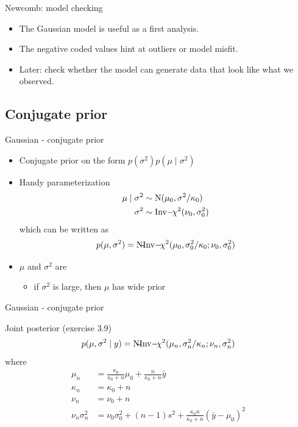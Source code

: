 \documentclass[10pt]{beamer}
\begin{document}
\begin{frame}{Newcomb: model checking}

  \begin{itemize}
  \item The Gaussian model is useful as a first analysis.
  \item The negative coded values hint at outliers or model misfit.
  \item Later: check whether the model can generate data that look like what we
    observed.
  \end{itemize}

\end{frame}

\subsection{Conjugate prior}

\begin{frame}{Gaussian - conjugate prior}

  \begin{itemize}
  \item[-] Conjugate prior on the form
    $p(\sigma^2)p(\mu \mid \sigma^2)$\\
    \pause
  \item[-] Handy parameterization
    \begin{align*}
      \mu \mid \sigma^2 & \sim \mathrm{N}(\mu_0,\sigma^2/\kappa_0)\\
      \sigma^2 & \sim \operatorname{Inv}\!-\!\chi^2(\nu_0,\sigma_0^2)
    \end{align*}
    which can be written as
    \begin{align*}
      p(\mu,\sigma^2)=\operatorname{N\!-\!Inv}\!-\!\chi^2(\mu_0,\sigma_0^2/\kappa_0;\nu_0,\sigma_0^2)
    \end{align*}
    \pause
  \item[-] $\mu$ and $\sigma^2$ are 
    \begin{itemize}
      \item[-] if $\sigma^2$ is large, then $\mu$ has wide prior
    \end{itemize}
  \end{itemize}

\end{frame}

\begin{frame}{Gaussian - conjugate prior}

  Joint posterior (exercise 3.9)
    \begin{align*}
      p(\mu,\sigma^2 \mid y)=\operatorname{N\!-\!Inv}\!-\!\chi^2(\mu_n,\sigma_n^2/\kappa_n;\nu_n,\sigma_n^2)
    \end{align*}
    where
    \begin{align*}
      \mu_n & = \frac{\kappa_0}{\kappa_0+n}\mu_0 + \frac{n}{\kappa_0+n}\bar{y} \\
      \kappa_n & = \kappa_0+n \\
      \nu_n & = \nu_0+n \\
      \nu_n\sigma_n^2 & =\nu_0\sigma_0^2 + (n-1)s^2 +
      \frac{\kappa_0 n}{\kappa_0+n}(\bar{y}-\mu_0)^2
    \end{align*}

\end{frame}
\end{document}

